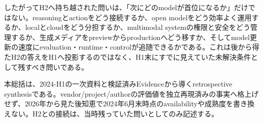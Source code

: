 したがってH2へ持ち越された問いは、「次にどのmodelが首位になるか」だけではない。reasoningとactionをどう接続するか、open modelをどう効率よく運用するか、localとcloudをどう分担するか、multimodal systemの権限と安全をどう管理するか、生成メディアをpreviewからproductionへどう移すか、そしてmodel更新の速度にevaluation・runtime・controlが追随できるかである。これは後から得たH2の答えをH1へ投影するのではなく、H1末にすでに見えていた未解決条件として残すべき問いである。\autocite{src-054d1f81750b,src-0fe343211040,src-2d3a533e91db,src-4ff5ab7d45bc,src-77e35e5f22be,src-b5fbfc0d43e4,src-c89d38f0e830,src-f9616f30e8f5}


\begin{claimboundary}
本総括は、2024-H1の一次資料と検証済みEvidenceから導くretrospective synthesisである。vendor/project/authorの評価値を独立再現済みの事実へ格上げせず、2026年から見た後知恵で2024年6月末時点のavailabilityや成熟度を書き換えない。H2との接続は、当時残っていた問いとしてのみ記述する。\autocite{src-054d1f81750b,src-0fe343211040,src-2d3a533e91db,src-2f7e28810d05,src-4ff5ab7d45bc,src-5019b9256d83,src-77e35e5f22be,src-b5fbfc0d43e4,src-c89d38f0e830,src-edd253654067,src-f9616f30e8f5}
\end{claimboundary}
